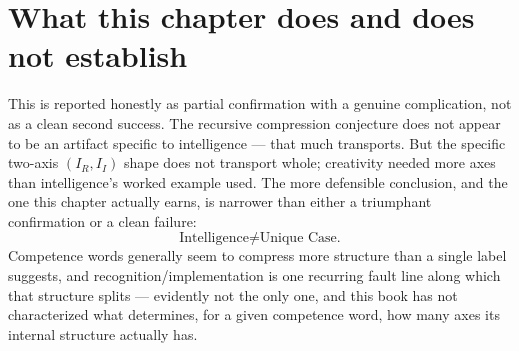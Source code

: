 \section{What this chapter does and does not establish}

This is reported honestly as partial confirmation with a genuine complication, not as a clean second success. The recursive compression conjecture does not appear to be an artifact specific to intelligence --- that much transports. But the specific two-axis $(I_R, I_I)$ shape does not transport whole; creativity needed more axes than intelligence's worked example used. The more defensible conclusion, and the one this chapter actually earns, is narrower than either a triumphant confirmation or a clean failure:
\[
\text{Intelligence} \neq \text{Unique Case.}
\]
Competence words generally seem to compress more structure than a single label suggests, and recognition/implementation is one recurring fault line along which that structure splits --- evidently not the only one, and this book has not characterized what determines, for a given competence word, how many axes its internal structure actually has.
